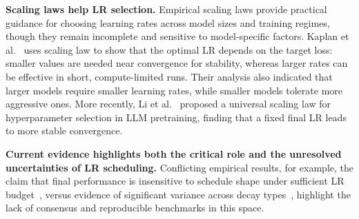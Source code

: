 \noindent\textbf{Scaling laws help LR selection.}
Empirical scaling laws provide practical guidance for choosing learning rates across model sizes and training regimes, though they remain incomplete and sensitive to model-specific factors. Kaplan et al.~\cite{kaplan2020scaling} uses scaling law to show that the optimal LR depends on the target loss: smaller values are needed near convergence for stability, whereas larger rates can be effective in short, compute-limited runs. Their analysis also indicated that larger models require smaller learning rates, while smaller models tolerate more aggressive ones. More recently, Li et al.~\cite{li2025predictable} proposed a universal scaling law for hyperparameter selection in LLM pretraining, finding that a fixed final LR leads to more stable convergence.

\noindent\textbf{Current evidence highlights both the critical role and the unresolved uncertainties of LR scheduling.}
Conflicting empirical results, for example, the claim that final performance is insensitive to schedule shape under sufficient LR budget~\cite{kaplan2020scaling}, versus evidence of significant variance across decay types~\cite{hoffmann2022training, defazio2023optimal}, highlight the lack of consensus and reproducible benchmarks in this space.